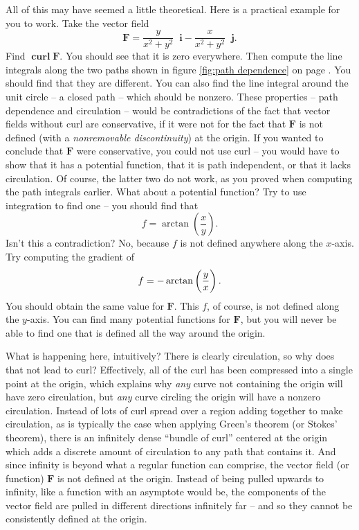 \documentclass{myarticle}
\DeclareMathOperator{\curl}{\mathbf{curl}}
\renewcommand{\vec}[1]{\mathbf{#1}}
\newcommand{\unitvector}[1]{
  \mathop{}\!\vec{#1}
}
\newcommand{\ih}{\unitvector{i}}
\newcommand{\jh}{\unitvector{j}}
\theoremstyle{nospace}
\newtheorem{old series theorem}{Theorem}
\newenvironment{series theorem}{\begin{mdframed}\begin{old series theorem}}{\end{old series theorem}\end{mdframed}}
\begin{document}
All of this may have seemed a little theoretical. Here is a practical example for you to work. Take the vector field \[ \vec{F} = \frac{y}{x^2 + y^2} \ih - \frac{x}{x^2 + y^2} \jh. \] Find $\curl \vec{F}$. You should see that it is zero everywhere. Then compute the line integrals along the two paths shown in figure \ref{fig:path dependence} on page \pageref{fig:path dependence}. You should find that they are different. You can also find the line integral around the unit circle -- a closed path -- which should be nonzero. These properties -- path dependence and circulation -- would be contradictions of the fact that vector fields without curl are conservative, if it were not for the fact that $\vec{F}$ is not defined (with a \textit{nonremovable discontinuity}) at the origin. If you wanted to conclude that $\vec{F}$ were conservative, you could not use curl -- you would have to show that it has a potential function, that it is path independent, or that it lacks circulation. Of course, the latter two do not work, as you proved when computing the path integrals earlier. What about a potential function? Try to use integration to find one -- you should find that \[ f = \arctan\left(\frac{x}{y}\right). \] Isn't this a contradiction? No, because $f$ is not defined anywhere along the $x$-axis. Try computing the gradient of \[ f = -\arctan\left(\frac{y}{x\vphantom{y}}\right). \] You should obtain the same value for $\vec{F}$. This $f$, of course, is not defined along the $y$-axis. You can find many potential functions for $\vec{F}$, but you will never be able to find one that is defined all the way around the origin.

What is happening here, intuitively? There is clearly circulation, so why does that not lead to curl? Effectively, all of the curl has been compressed into a single point at the origin, which explains why \textit{any} curve not containing the origin will have zero circulation, but \textit{any} curve circling the origin will have a nonzero circulation. Instead of lots of curl spread over a region adding together to make circulation, as is typically the case when applying Green's theorem (or Stokes' theorem), there is an infinitely dense ``bundle of curl'' centered at the origin which adds a discrete amount of circulation to any path that contains it. And since infinity is beyond what a regular function can comprise, the vector field (or function) $\vec{F}$ is not defined at the origin. Instead of being pulled upwards to infinity, like a function with an asymptote would be, the components of the vector field are pulled in different directions infinitely far -- and so they cannot be consistently defined at the origin.
\end{document}
